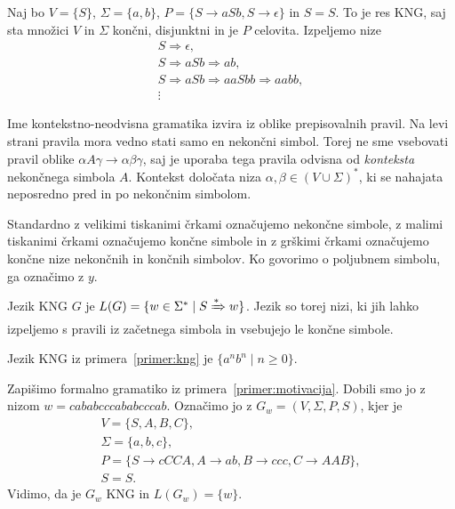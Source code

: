 \documentclass[fin1, tisk]{fmfdelo}
\theoremstyle{definition}
\begin{document}
\begin{primer}
    Naj bo $ V = \{ S\}$, 
    $\Sigma = \{ a,b \}$, 
    $P = \{ S \rightarrow aSb, S \rightarrow \epsilon \}$ in
    $S = S$.
    To je res KNG, saj sta množici $V$ in $\Sigma$ končni, disjunktni in je $P$ celovita.
    Izpeljemo nize
    \begin{gather*}
        S \Rightarrow \epsilon, \\
        S \Rightarrow \mathit{aSb} \Rightarrow \mathit{ab}, \\
        S \Rightarrow \mathit{aSb} \Rightarrow \mathit{aaSbb} \Rightarrow \mathit{aabb}, \\
        \vdots
    \end{gather*}
\end{primer}

Ime kontekstno-neodvisna gramatika izvira iz oblike prepisovalnih pravil. Na levi strani 
pravila mora vedno stati samo en nekončni simbol. Torej ne sme vsebovati pravil oblike 
$\alpha A \gamma \rightarrow \alpha\beta\gamma$, saj je uporaba tega pravila odvisna od 
\emph{konteksta} nekončnega simbola $A$. Kontekst določata niza 
$\alpha, \beta \in ( V \cup \Sigma )^*$, ki se nahajata neposredno pred in po nekončnim simbolom.

Standardno z velikimi tiskanimi črkami označujemo nekončne simbole, z malimi tiskanimi črkami 
označujemo končne simbole in z grškimi črkami označujemo končne nize nekončnih in končnih simbolov.
Ko govorimo o poljubnem simbolu, ga označimo z $y$.

\begin{definicija}\label{primer:kng}
    Jezik KNG $G$ je $L(G) = \{ w \in \Sigma^* \mid S \xRightarrow{*} w \}$. Jezik so torej nizi,
    ki jih lahko izpeljemo s pravili iz začetnega simbola in vsebujejo le končne simbole.
\end{definicija}

\begin{primer}
    Jezik KNG iz primera~\ref{primer:kng} je $\{ a^n b^n \mid n \geq 0 \}$.
\end{primer}

\begin{primer}
    Zapišimo formalno gramatiko iz primera~\ref{primer:motivacija}. Dobili smo jo z nizom
    $w = \mathit{cababcccababcccab} $. Označimo jo z $ G_w = (V, \Sigma, P, S) $, kjer je 
    \begin{gather*}
        V = \{ S, A, B, C \}, \\
        \Sigma = \{ a, b, c \}, \\
        P = \{ S \rightarrow \mathit{cCCA}, A \rightarrow \mathit{ab}, B 
        \rightarrow \mathit{ccc}, C \rightarrow \mathit{AAB} \}, \\
        S = S.
    \end{gather*}
    Vidimo, da je $G_w$ KNG in $ L(G_w) = \{w\} $.
\end{primer}
\end{document}
